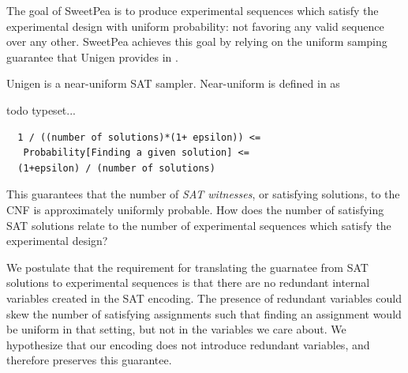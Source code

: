 The goal of SweetPea is to produce experimental sequences which satisfy the experimental design with uniform probability: not favoring any valid sequence over any other. SweetPea achieves this goal by relying on the uniform samping guarantee that Unigen provides in \cite{chakraborty2013scalable}.

Unigen is a near-uniform SAT sampler. Near-uniform is defined in \cite{meel2016constrained} as

todo typeset...
\begin{verbatim}
  1 / ((number of solutions)*(1+ epsilon)) <=
   Probability[Finding a given solution] <=
  (1+epsilon) / (number of solutions)
\end{verbatim}

This guarantees that the number of \emph{SAT witnesses}, or satisfying solutions, to the CNF is approximately uniformly probable. How does the number of satisfying SAT solutions relate to the number of experimental sequences which satisfy the experimental design?

We postulate that the requirement for translating the guarnatee from SAT solutions to experimental sequences is that there are no redundant internal variables created in the SAT encoding. The presence of redundant variables could skew the number of satisfying assignments such that finding an assignment would be uniform in that setting, but not in the variables we care about. We hypothesize that our encoding does not introduce redundant variables, and therefore preserves this guarantee. 

